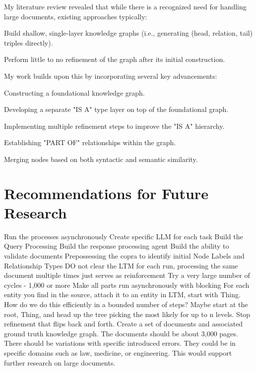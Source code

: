 My literature review revealed that while there is a recognized need for handling large documents, existing approaches typically:

Build shallow, single-layer knowledge graphs (i.e., generating (head, relation, tail) triples directly).

Perform little to no refinement of the graph after its initial construction.

My work builds upon this by incorporating several key advancements:

Constructing a foundational knowledge graph.

Developing a separate "IS A" type layer on top of the foundational graph.

Implementing multiple refinement steps to improve the "IS A" hierarchy.

Establishing "PART OF" relationships within the graph.

Merging nodes based on both syntactic and semantic similarity.

\section{Recommendations for Future Research}

Run the processes asynchronously
Create specific LLM for each task
Build the Query Processing
Build the response processing agent
Build the ability to validate documents
Prepossessing the copra to identify initial Node Labels and Relationship Types
DO not clear the LTM for each run, processing the same document multiple times just serves as reinforcement
Try a very large number of cycles - 1,000 or more
Make all parts run asynchronously with blocking
For each entity you find in the source, attach it to an entity in LTM, start with Thing. How do we do this efficiently in a bounded number of steps? Maybe start at the root, Thing, and head up the tree picking the most likely for up to n levels.
Stop refinement that flips back and forth.
Create a set of documents and associated ground truth knowledge graph. The documents should be about 3,000 pages. There should be variations with specific introduced errors. They could be in specific domains such as law, medicine, or engineering. This would support further research on large documents.

